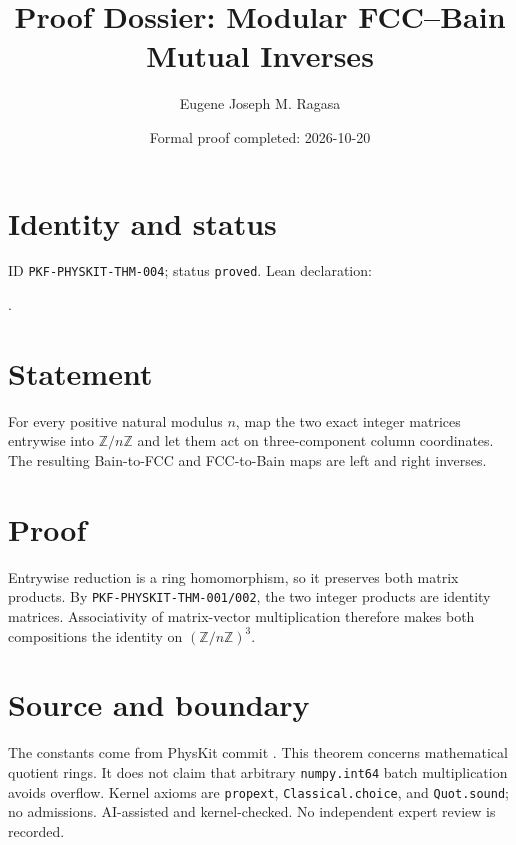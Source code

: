 \documentclass[11pt]{article}
\title{Proof Dossier: Modular FCC--Bain Mutual Inverses}\author{Eugene Joseph M. Ragasa}\date{Formal proof completed: 2026-10-20}
\begin{document}
\maketitle
\section{Identity and status}
ID \texttt{PKF-PHYSKIT-THM-004}; status \texttt{proved}. Lean declaration:
\par{}.
\section{Statement}
For every positive natural modulus $n$, map the two exact integer matrices entrywise into
$\mathbb Z/n\mathbb Z$ and let them act on three-component column coordinates. The resulting
Bain-to-FCC and FCC-to-Bain maps are left and right inverses.
\section{Proof}
Entrywise reduction is a ring homomorphism, so it preserves both matrix products.
By \texttt{PKF-PHYSKIT-THM-001/002}, the two integer products are identity matrices.
Associativity of matrix-vector multiplication therefore makes both compositions the
identity on $(\mathbb Z/n\mathbb Z)^3$.
\section{Source and boundary}
The constants come from PhysKit commit
. This theorem concerns mathematical
quotient rings. It does not claim that arbitrary \texttt{numpy.int64} batch multiplication
avoids overflow. Kernel axioms are \texttt{propext}, \texttt{Classical.choice}, and
\texttt{Quot.sound}; no admissions. AI-assisted and kernel-checked. No independent expert
review is recorded.
\end{document}
